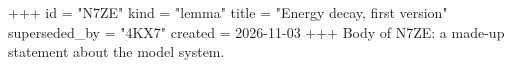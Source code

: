+++
id = "N7ZE"
kind = "lemma"
title = "Energy decay, first version"
superseded_by = "4KX7"
created = 2026-11-03
+++
Body of N7ZE: a made-up statement about the model system.
